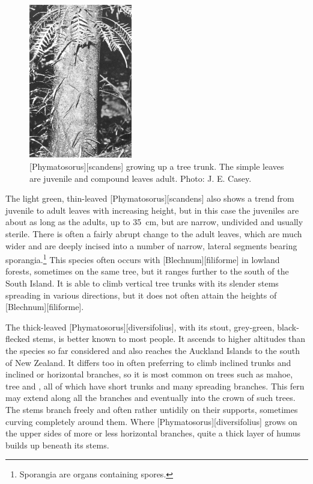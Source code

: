 \begin{figure}
	\includegraphics[width=0.4\textwidth]{graphics/figure29scandens.jpg}
	\centering
	\caption[\emph{Phymatosorus scandens} growing up a tree trunk]{[Phymatosorus][scandens] growing up a tree trunk.
The simple leaves are juvenile and compound leaves adult.
	Photo: J. E. Casey.}%
	\label{fig:29scandens}
\end{figure}

The light green, thin-leaved [Phymatosorus][scandens] also shows a trend from juvenile to adult leaves with increasing height, but in this case the juveniles are about as long as the adults, up to \SI{35}{\centi\metre}, but are narrow, undivided and usually sterile.
There is often a fairly abrupt change to the adult leaves, which are much wider and are deeply incised into a number of narrow, lateral segments bearing sporangia.\footnote{Sporangia are organs containing spores.}
This species often occurs with [Blechnum][filiforme] in lowland forests, sometimes on the same tree, but it ranges further to the south of the South Island.
It is able to climb vertical tree trunks with its slender stems spreading in various directions, but it does not often attain the heights of [Blechnum][filiforme].

The thick-leaved [Phymatosorus][diversifolius], with its stout, grey-green, black-flecked stems, is better known to most people.
It ascends to higher altitudes than the species so far considered and also reaches the Auckland Islands to the south of New Zealand.
It differs too in often preferring to climb inclined trunks and inclined or horizontal branches, so it is most common on trees such as mahoe, tree  and , all of which have short trunks and many spreading branches.
This fern may extend along all the branches and eventually into the crown of such trees.
The stems branch freely and often rather untidily on their supports, sometimes curving completely around them.
Where [Phymatosorus][diversifolius] grows on the upper sides of more or less horizontal branches, quite a thick layer of humus builds up beneath its stems.


